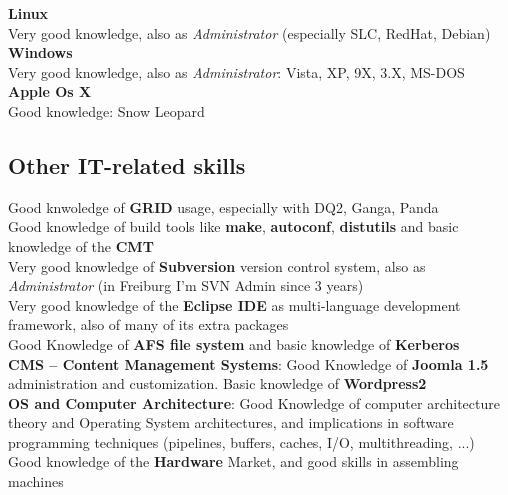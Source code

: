 \documentclass[10pt, a4paper]{article}
\begin{document}
\textbf{Linux}\\ Very good knowledge, also as \textit{Administrator} (especially SLC, RedHat, Debian)\\

\textbf{Windows}\\ Very good knowledge, also as \textit{Administrator}: Vista, XP, 9X, 3.X, MS-DOS\\

\textbf{Apple Os X}\\ Good knowledge: Snow Leopard\\


	
\subsection{Other IT-related skills}	

Good knwoledge of \textbf{GRID} usage, especially with DQ2, Ganga, Panda\\

Good knowledge of build tools like \textbf{make}, \textbf{autoconf}, \textbf{distutils} and basic knowledge of the \textbf{CMT}\\

Very good knowledge of \textbf{Subversion} version control system, also as \textit{Administrator} (in Freiburg I'm SVN Admin since 3 years)\\

Very good knowledge of the \textbf{Eclipse IDE} as multi-language development framework, also of many of its extra packages\\

Good Knowledge of \textbf{AFS file system} and basic knowledge of \textbf{Kerberos}\\

\textbf{CMS -- Content Management Systems}: Good Knowledge of \textbf{Joomla 1.5} administration and customization. Basic knowledge of \textbf{Wordpress2}\\

\textbf{OS and Computer Architecture}: Good Knowledge of computer architecture theory and Operating System architectures, and implications in software programming techniques (pipelines, buffers, caches, I/O, multithreading, ...)\\

Good knowledge of the \textbf{Hardware} Market, and good skills in assembling machines\\
\end{document}
